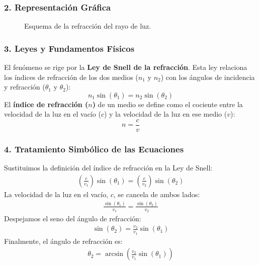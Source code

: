 \subsubsection*{2. Representación Gráfica}
\begin{figure}[H]
    \centering
    \caption{Esquema de la refracción del rayo de luz.}
\end{figure}

\subsubsection*{3. Leyes y Fundamentos Físicos}
El fenómeno se rige por la \textbf{Ley de Snell de la refracción}. Esta ley relaciona los índices de refracción de los dos medios ($n_1$ y $n_2$) con los ángulos de incidencia y refracción ($\theta_1$ y $\theta_2$):
$$ n_1 \sin(\theta_1) = n_2 \sin(\theta_2) $$
El \textbf{índice de refracción ($n$)} de un medio se define como el cociente entre la velocidad de la luz en el vacío ($c$) y la velocidad de la luz en ese medio ($v$):
$$ n = \frac{c}{v} $$

\subsubsection*{4. Tratamiento Simbólico de las Ecuaciones}
Sustituimos la definición del índice de refracción en la Ley de Snell:
\begin{gather}
    \left(\frac{c}{v_1}\right) \sin(\theta_1) = \left(\frac{c}{v_2}\right) \sin(\theta_2)
\end{gather}
La velocidad de la luz en el vacío, $c$, se cancela de ambos lados:
\begin{gather}
    \frac{\sin(\theta_1)}{v_1} = \frac{\sin(\theta_2)}{v_2}
\end{gather}
Despejamos el seno del ángulo de refracción:
\begin{gather}
    \sin(\theta_2) = \frac{v_2}{v_1} \sin(\theta_1)
\end{gather}
Finalmente, el ángulo de refracción es:
\begin{gather}
    \theta_2 = \arcsin\left(\frac{v_2}{v_1} \sin(\theta_1)\right)
\end{gather}

